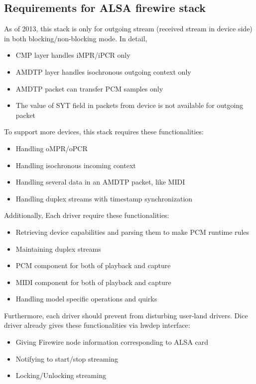 \documentclass[onecolumn]{article}
\begin{document}
\subsection{Requirements for ALSA firewire stack}

As of 2013, this stack is only for outgoing stream (received stream in device side) in both blocking/non-blocking mode. In detail,
\begin{itemize}
\item CMP layer handles iMPR/iPCR only
\item AMDTP layer handles isochronous outgoing context only
\item AMDTP packet can transfer PCM samples only
\item The value of SYT field in packets from device is not available for outgoing packet
\end{itemize}

To support more devices, this stack requires these functionalities:
\begin{itemize}
\item Handling oMPR/oPCR
\item Handling isochronous incoming context
\item Handling several data in an AMDTP packet, like MIDI
\item Handling duplex streams with timestamp synchronization
\end{itemize}

Additionally, Each driver require these functionalities:
\begin{itemize}
\item Retrieving device capabilities and parsing them to make PCM runtime rules
\item Maintaining duplex streams
\item PCM component for both of playback and capture
\item MIDI component for both of playback and capture
\item Handling model specific operations and quirks
\end{itemize}

Furthermore, each driver should prevent from disturbing user-land drivers. Dice driver already gives these functionalities via hwdep interface:
\begin{itemize}
\item Giving Firewire node information corresponding to ALSA card
\item Notifying to start/stop streaming
\item Locking/Unlocking streaming
\end{itemize}
\end{document}

